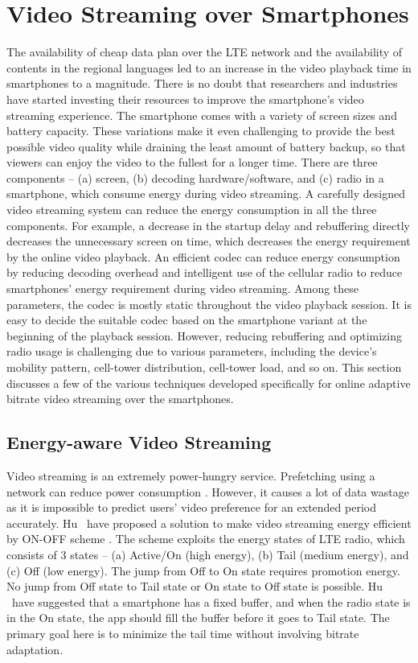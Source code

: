 \section{Video Streaming over Smartphones}
The availability of cheap data plan over the \ac{LTE} network and the availability of contents in the regional languages led to an increase in the video playback time in smartphones to a magnitude. There is no doubt that researchers and industries have started investing their resources to improve the smartphone's video streaming experience. The smartphone comes with a variety of screen sizes and battery capacity. These variations make it even challenging to provide the best possible video quality while draining the least amount of battery backup, so that viewers can enjoy the video to the fullest for a longer time. There are three components -- (a) screen, (b) decoding hardware/software, and (c) radio in a smartphone, which consume energy during video streaming. A carefully designed video streaming system can reduce the energy consumption in all the three components. For example, a decrease in the startup delay and rebuffering directly decreases the unnecessary screen on time, which decreases the energy requirement by the online video playback. An efficient codec can reduce energy consumption by reducing decoding overhead and intelligent use of the cellular radio to reduce smartphones' energy requirement during video streaming. Among these parameters, the codec is mostly static throughout the video playback session. It is easy to decide the suitable codec based on the smartphone variant at the beginning of the playback session. However, reducing rebuffering and optimizing radio usage is challenging due to various parameters, including the device's mobility pattern, cell-tower distribution, cell-tower load, and so on. This section discusses a few of the various techniques developed specifically for online adaptive bitrate video streaming over the smartphones.

\subsection{Energy-aware Video Streaming}
Video streaming is an extremely power-hungry service. Prefetching using a  network can reduce power consumption \cite{6681586,10.1145/2079296.2079321}. However, it causes a lot of data wastage as it is impossible to predict users' video preference for an extended period accurately. Hu \etal\ have proposed a solution to make video streaming energy efficient by ON-OFF scheme \cite{7218493}. The scheme exploits the energy states of \ac{LTE} radio, which consists of 3 states -- (a) Active/On (high energy), (b) Tail (medium energy), and (c) Off (low energy). The jump from Off to On state requires promotion energy. No jump from Off state to Tail state or On state to Off state is possible. Hu \etal\ have suggested that a smartphone has a fixed buffer, and when the radio state is in the On state, the app should fill the buffer before it goes to Tail state. The primary goal here is to minimize the tail time without involving bitrate adaptation.

